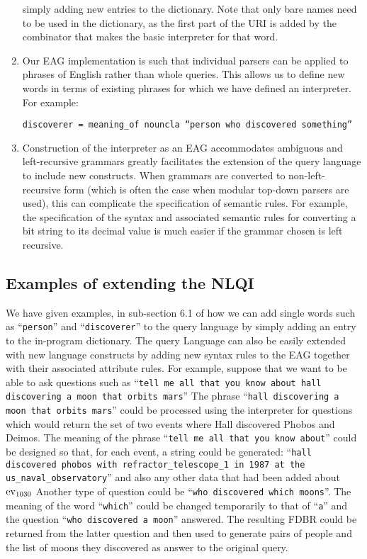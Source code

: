 \documentclass[../main.tex]{subfiles}
\begin{document}
\begin{refsection}
\begin{enumerate}
	simply adding new entries to the dictionary.
	Note that only bare names need to be used in the dictionary, as the first part of the URI is added
	by the combinator that makes the basic interpreter for that word.
	\item Our EAG implementation is such that individual parsers can be applied to phrases of English
	rather than whole queries. This allows us to define new words in terms of existing phrases for
	which we have defined an interpreter. For example:
	\begin{center} \texttt{discoverer = meaning\_of nouncla ``person who discovered something''} \end{center}

	\item Construction of the interpreter as an EAG accommodates ambiguous and left-recursive
	grammars greatly facilitates the extension of the query language to include new
	constructs. When grammars are converted to non-left-recursive
	form (which is often the case when modular top-down parsers are used), this can complicate the
	specification of semantic rules. For example, the specification of the syntax and associated
	semantic rules for converting a bit string to its decimal value is much easier if the grammar
	chosen is left recursive.
\end{enumerate}

\subsection{Examples of extending the NLQI}

We have given examples, in sub-section 6.1 of how we can add single words such as ``\texttt{person}'' and
``\texttt{discoverer}'' to the query language by simply adding an entry to the in-program dictionary.
The query Language can also be easily extended with new language constructs by adding new syntax
rules to the EAG together with their associated attribute rules. For example, suppose that we want to be able to ask questions such as ``\texttt{tell me all that you
know about hall discovering a moon that orbits mars}'' The phrase ``\texttt{hall discovering a moon that orbits
mars}'' could be processed using the interpreter for questions which would return the set of two events
where Hall discovered Phobos and Deimos. The meaning of the phrase ``\texttt{tell me all that
you know about}'' could be designed so that, for each event, a string could be generated: ``\texttt{hall discovered phobos with refractor\_telescope\_1 in 1987 at the us\_naval\_observatory}''
and also any other data that had been added about $\operatorname{ev}_{1030}$
Another type of question could be ``\texttt{who discovered which moons}''. The meaning of the word ``\texttt{which}''
could be changed temporarily to that of ``\texttt{a}'' and the question ``\texttt{who discovered a moon}'' answered. The
resulting FDBR could be returned from the latter question and then used to generate pairs of people and
the list of moons they discovered as answer to the original query.


\end{refsection}
\end{document}
